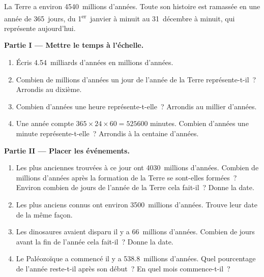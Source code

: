 \begin{problem}
\label{pb:g7:geological-time:1}
La Terre a environ \num{4540}~millions d'années. Toute son histoire est
ramassée en une année de 365~jours, du 1\textsuperscript{er}~janvier à
minuit au 31~décembre à minuit, qui représente aujourd'hui.

\medskip
\noindent\textbf{Partie I --- Mettre le temps à l'échelle.}\par\nopagebreak
\begin{enumerate}[beginpenalty=10000]
  \item Écris \num{4.54}~milliards d'années en millions d'années.
  \item Combien de millions d'années un jour de l'année de la Terre
        représente-t-il~? Arrondis au dixième.
  \item Combien d'années une heure représente-t-elle~? Arrondis au millier
        d'années.
  \item Une année compte $365 \times 24 \times 60 = \num{525600}$ minutes.
        Combien d'années une minute représente-t-elle~? Arrondis à la
        centaine d'années.
\end{enumerate}

\medskip
\noindent\textbf{Partie II --- Placer les événements.}\par\nopagebreak
\begin{enumerate}[resume, beginpenalty=10000]
  \item Les plus anciennes  trouvées à ce jour ont \num{4030}~millions
        d'années. Combien de millions d'années après la formation de la
        Terre se sont-elles formées~? Environ combien de jours de l'année
        de la Terre cela fait-il~? Donne la date.
  \item Les plus anciens  connus ont environ \num{3500}~millions
        d'années. Trouve leur date de la même façon.
  \item Les dinosaures avaient disparu il y a \num{66}~millions d'années.
        Combien de jours avant la fin de l'année cela fait-il~? Donne la
        date.
  \item Le Paléozoïque a commencé il y a \num{538.8}~millions d'années.
        Quel pourcentage de l'année reste-t-il après son début~? En quel
        mois commence-t-il~?
\end{enumerate}


\end{problem}

